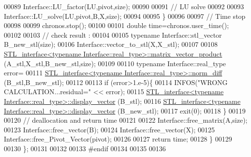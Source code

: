 \begin{DoxyCode}
00089       Interface::LU\_factor(LU,pivot,size);
00090       
00091       \textcolor{comment}{// LU solve}
00092 
00093       Interface::LU\_solve(LU,pivot,B,X,size);
00094 
00095     \}
00096 
00097     \textcolor{comment}{// Time stop}
00098 
00099     chronos.stop();
00100 
00101     \textcolor{keywordtype}{double} time=chronos.user\_time();
00102   
00103     \textcolor{comment}{// check result :}
00104 
00105     \textcolor{keyword}{typename} Interface::stl\_vector B\_new\_stl(size);
00106     Interface::vector\_to\_stl(X,X\_stl);
00107 
00108     \hyperlink{class_s_t_l__interface}{STL\_interface<typename Interface::real\_type>::matrix\_vector\_product}
      (A\_stl,X\_stl,B\_new\_stl,size); 
00109   
00110     \textcolor{keyword}{typename} Interface::real\_type error=
00111       \hyperlink{class_s_t_l__interface}{STL\_interface<typename Interface::real\_type>::norm\_diff}
      (B\_stl,B\_new\_stl);
00112     
00113     \textcolor{keywordflow}{if} (error>1.e-5)\{
00114       INFOS(\textcolor{stringliteral}{"WRONG CALCULATION...residual="} << error);
00115       \hyperlink{class_s_t_l__interface}{STL\_interface<typename Interface::real\_type>::display\_vector}
      (B\_stl);
00116       \hyperlink{class_s_t_l__interface}{STL\_interface<typename Interface::real\_type>::display\_vector}
      (B\_new\_stl);
00117       exit(0);
00118     \}
00119     
00120     \textcolor{comment}{// deallocation and return time}
00121     
00122     Interface::free\_matrix(A,size);
00123     Interface::free\_vector(B);
00124     Interface::free\_vector(X);
00125     Interface::free\_Pivot\_Vector(pivot);
00126 
00127     \textcolor{keywordflow}{return} time;
00128   \}
00129 
00130 \};
00131   
00132 
00133 \textcolor{preprocessor}{#endif}
00134 
00135 
00136 
\end{DoxyCode}
